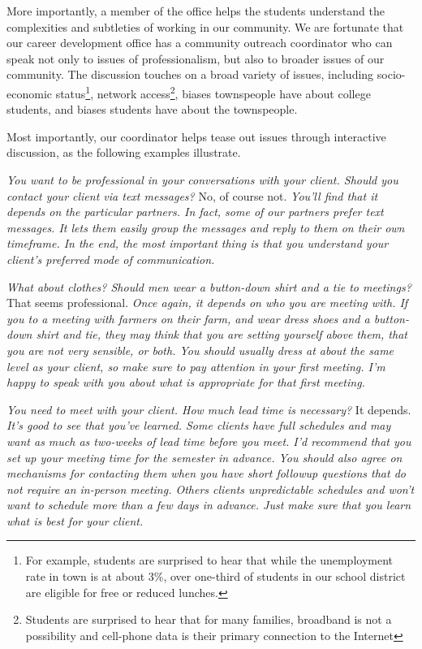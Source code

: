 More importantly, a member of the office helps the students understand
the complexities and subtleties of working in our community.  We
are fortunate that our career development office has a community
outreach coordinator who can speak not only to issues of professionalism,
but also to broader issues of our community.  The discussion touches
on a broad variety of issues, including socio-economic status\footnote{For
example, students are surprised to hear that while the unemployment
rate in town is at about 3\%, over one-third of students in our
school district are eligible for free or reduced lunches.}, network
access\footnote{Students are surprised to hear that for many families,
broadband is not a possibility and cell-phone data is their primary
connection to the Internet}, biases townspeople have about college
students, and biases students have about the townspeople.

Most importantly, our coordinator helps tease out issues through interactive
discussion, as the following examples illustrate.

\newcommand{\question}[1]{\textsl{#1}}
\newcommand{\answer}[1]{#1}
\newcommand{\followup}[1]{\textsl{#1}}

\question{You want to be professional in your conversations with your client.  Should you contact your client via text messages?}
\answer{No, of course not.}
\followup{You'll find that it depends on the particular partners.  In fact, some of our partners prefer text messages.  It lets them easily group the messages and reply to them on their own timeframe.  In the end, the most important thing is that you understand your client's preferred mode of communication.}

\question{What about clothes?  Should men wear a button-down shirt and a tie to meetings?}
\answer{That seems professional.}
\followup{Once again, it depends on who you are meeting with.  If
you to a meeting with farmers on their farm, and wear dress shoes
and a button-down shirt and tie, they may think that you are setting
yourself above them, that you are not very sensible, or both.
You should usually dress at about the same level as your client,
so make sure to pay attention in your first meeting.  I'm happy
to speak with you about what is appropriate for that first meeting.}

\question{You need to meet with your client.  How much lead time is necessary?}
\answer{It depends.}
\followup{It's good to see that you've learned.  Some clients have full
schedules and may want as much as two-weeks of lead time before
you meet.  I'd recommend that you set up your meeting time for the
semester in advance.  You should also agree on mechanisms for
contacting them when you have short followup questions that do not
require an in-person meeting.  Others clients unpredictable schedules
and won't want to schedule more than a few days in advance.  Just make
sure that you learn what is best for your client.}

